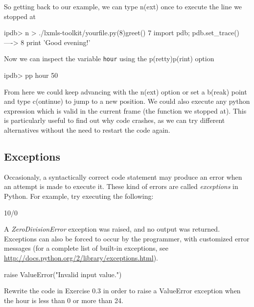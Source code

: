 
So getting back to our example, we can type n(ext) once to execute the line we stopped at

\begin{python}
ipdb> n
> ./lxmls-toolkit/yourfile.py(8)greet()
      7                 import pdb; pdb.set_trace()
----> 8                 print 'Good evening!' 
\end{python}

Now we can inspect the variable \texttt{hour} using the p(retty)p(rint) option

\begin{python}
ipdb> pp hour
50
\end{python}

From here we could keep advancing with the n(ext) option or set a b(reak) point and type c(ontinue) to jump to a new position. We could also execute any python expression which is valid in the current frame (the function we stopped at). This is particularly useful to find out why code crashes, as we can try different alternatives without the need to restart the code again.

\subsection{Exceptions}

Occasionaly, a syntactically correct code statement may produce an error when an attempt is made to execute it. These kind of errors are called \textit{exceptions} in Python. For example, try executing the following:

\begin{python}
10/0
\end{python}

A \textit{ZeroDivisionError} exception was raised, and no output was returned. Exceptions can also be forced to occur by the programmer, with customized error messages (for a complete list of built-in exceptions, see \url{http://docs.python.org/2/library/exceptions.html}).

\begin{python}
raise ValueError("Invalid input value.")
\end{python}

\begin{exercise}
Rewrite the code in Exercise 0.3 in order to raise a ValueError exception when the hour is less than 0 or more than 24.
\end{exercise}

